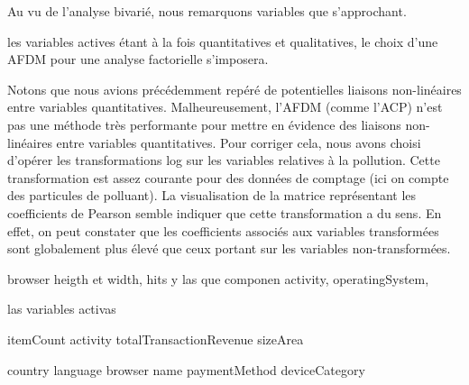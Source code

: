 Au vu de l'analyse bivarié, nous remarquons variables que s'approchant.


les variables actives étant à la fois quantitatives et qualitatives, le choix d'une AFDM pour une analyse factorielle s'imposera.

Notons que nous avions précédemment repéré de potentielles liaisons non-linéaires entre variables quantitatives. Malheureusement, l'AFDM (comme l'ACP) n'est pas une méthode très performante pour mettre en évidence des liaisons non-linéaires entre variables quantitatives. Pour corriger cela, nous avons choisi d'opérer les transformations log sur les variables relatives à la pollution. Cette transformation est assez courante pour des données de comptage (ici on compte des particules de polluant). La visualisation de la matrice représentant les coefficients de Pearson semble indiquer que cette transformation a du sens. En effet, on peut constater que les coefficients associés aux variables transformées sont globalement plus élevé que ceux portant sur les variables non-transformées.

browser heigth et width, hits y las que componen activity, operatingSystem, 

las variables activas

itemCount
activity
totalTransactionRevenue
sizeArea

country
language
browser name
paymentMethod
deviceCategory